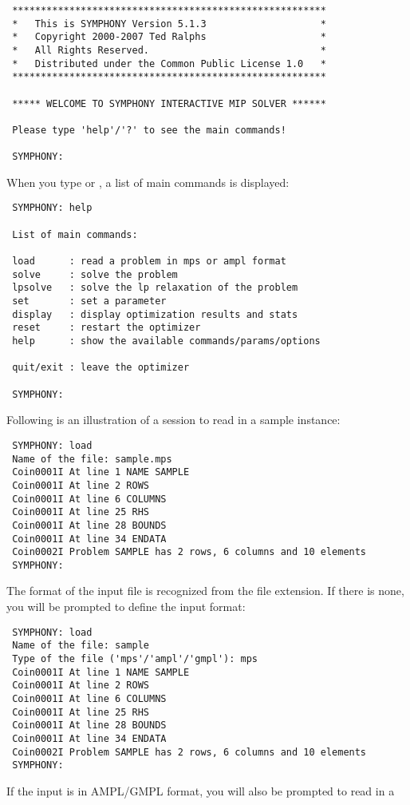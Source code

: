 {\color{Brown}
\begin{verbatim}
 *******************************************************
 *   This is SYMPHONY Version 5.1.3                    *
 *   Copyright 2000-2007 Ted Ralphs                    *
 *   All Rights Reserved.                              *
 *   Distributed under the Common Public License 1.0   *
 *******************************************************

 ***** WELCOME TO SYMPHONY INTERACTIVE MIP SOLVER ******

 Please type 'help'/'?' to see the main commands!

 SYMPHONY:
\end{verbatim}
}
When you type  or , a list of main commands is displayed:
{\color{Brown}
\begin{verbatim}
 SYMPHONY: help

 List of main commands:

 load      : read a problem in mps or ampl format
 solve     : solve the problem
 lpsolve   : solve the lp relaxation of the problem
 set       : set a parameter
 display   : display optimization results and stats
 reset     : restart the optimizer
 help      : show the available commands/params/options

 quit/exit : leave the optimizer

 SYMPHONY:
\end{verbatim}
}
Following is an illustration of a session to read in a sample instance:
{\color{Brown}
\begin{verbatim}
 SYMPHONY: load 
 Name of the file: sample.mps
 Coin0001I At line 1 NAME SAMPLE
 Coin0001I At line 2 ROWS
 Coin0001I At line 6 COLUMNS
 Coin0001I At line 25 RHS
 Coin0001I At line 28 BOUNDS
 Coin0001I At line 34 ENDATA
 Coin0002I Problem SAMPLE has 2 rows, 6 columns and 10 elements
 SYMPHONY: 
\end{verbatim}
}
The format of the input file is recognized from the file extension. If there is
none, you will be prompted to define the input format: 
{\color{Brown}
\begin{verbatim}
 SYMPHONY: load 
 Name of the file: sample
 Type of the file ('mps'/'ampl'/'gmpl'): mps 
 Coin0001I At line 1 NAME SAMPLE
 Coin0001I At line 2 ROWS
 Coin0001I At line 6 COLUMNS
 Coin0001I At line 25 RHS
 Coin0001I At line 28 BOUNDS
 Coin0001I At line 34 ENDATA
 Coin0002I Problem SAMPLE has 2 rows, 6 columns and 10 elements
 SYMPHONY: 
\end{verbatim}
} 
If the input is in AMPL/GMPL format, you will also be prompted to read in a
